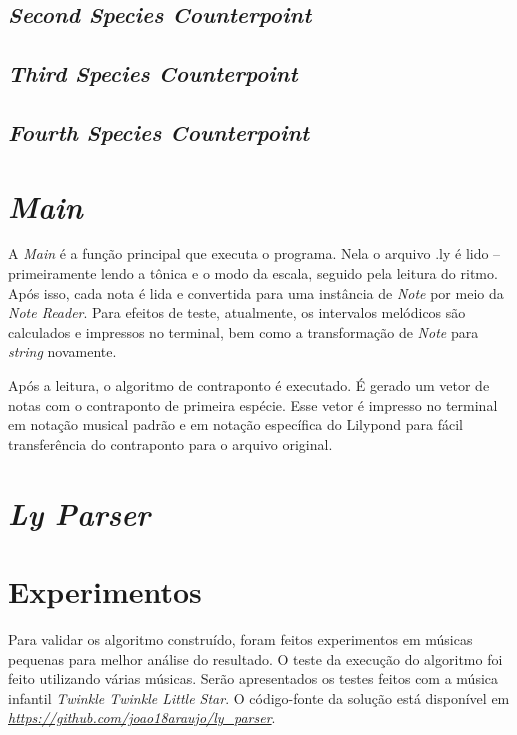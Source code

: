   \subsection[\textit{Second Species Counterpoint}]{\textit{Second Species Counterpoint}}

  \subsection[\textit{Third Species Counterpoint}]{\textit{Third Species Counterpoint}}

  \subsection[\textit{Fourth Species Counterpoint}]{\textit{Fourth Species Counterpoint}}

  \section[\textit{Main}]{\textit{Main}}

    A \textit{Main} é a função principal que executa o programa. Nela o arquivo .ly é lido -- primeiramente lendo a tônica e o modo da escala, seguido pela leitura do ritmo. Após isso, cada nota é lida e convertida para uma instância de \textit{Note} por meio da \textit{Note Reader}. Para efeitos de teste, atualmente, os intervalos melódicos são calculados e impressos no terminal, bem como a transformação de \textit{Note} para \textit{string} novamente.

    Após a leitura, o algoritmo de contraponto é executado. É gerado um vetor de notas com o contraponto de primeira espécie. Esse vetor é impresso no terminal em notação musical padrão e em notação específica do Lilypond para fácil transferência do contraponto para o arquivo original.

  \section[\textit{Ly Parser}]{\textit{Ly Parser}}

  \section[Experimentos]{Experimentos}

    Para validar os algoritmo construído, foram feitos experimentos em músicas pequenas para melhor análise do resultado. O teste da execução do algoritmo foi feito utilizando várias músicas. Serão apresentados os testes feitos com a música infantil \textit{Twinkle Twinkle Little Star}. O código-fonte da solução está disponível em \textit{\url{https://github.com/joao18araujo/ly_parser}}.

